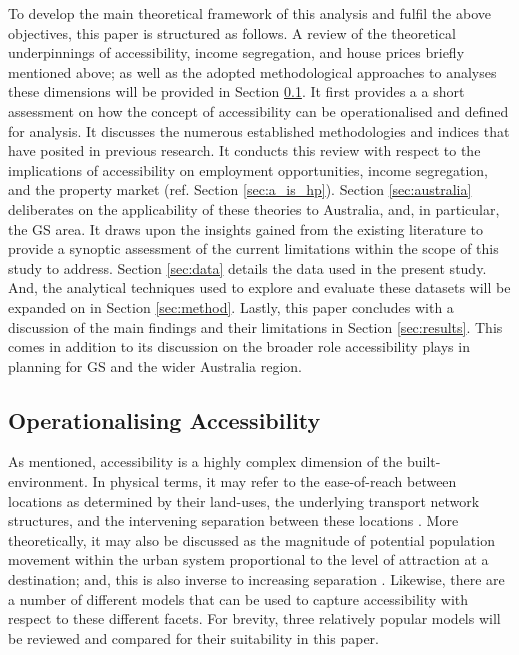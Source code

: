 To develop the main theoretical framework of this analysis and fulfil the above objectives, this paper is structured as follows. A review of the theoretical underpinnings of accessibility, income segregation, and house prices briefly mentioned above; as well as the adopted methodological approaches to analyses these dimensions will be provided in Section \ref{sec:operationalising}. It first provides a a short assessment on how the concept of accessibility can be operationalised and defined for analysis. It discusses the numerous established methodologies and indices that have posited in previous research. It conducts this review with respect to the implications of accessibility on employment opportunities, income segregation, and the property market (ref. Section \ref{sec:a_is_hp}). Section \ref{sec:australia} deliberates on the applicability of these theories to Australia, and, in particular, the GS area. It draws upon the insights gained from the existing literature to provide a synoptic assessment of the current limitations within the scope of this study to address. Section \ref{sec:data} details the data used in the present study. And, the analytical techniques used to explore and evaluate these datasets will be expanded on in Section \ref{sec:method}. Lastly, this paper concludes with a discussion of the main findings and their limitations in Section \ref{sec:results}. This comes in addition to its discussion on the broader role accessibility plays in planning for GS and the wider Australia region.\\

\subsection{Operationalising Accessibility}
\label{sec:operationalising}

As mentioned, accessibility is a highly complex dimension of the built-environment. In physical terms, it may refer to the ease-of-reach between locations as determined by their land-uses, the underlying transport network structures, and the intervening separation between these locations \citep{mackiewicz1996towards, handy1997measuring}. More theoretically, it may also be discussed as the magnitude of potential population movement within the urban system proportional to the level of attraction at a destination; and, this is also inverse to increasing separation  \citep{hansen1959accessibility,wilson1971family,van1999accessibility, geurs2012accessibility,miller2018accessibility}. Likewise, there are a number of different models that can be used to capture accessibility with respect to these different facets. For brevity, three relatively popular models will be reviewed and compared for their suitability in this paper.\\

